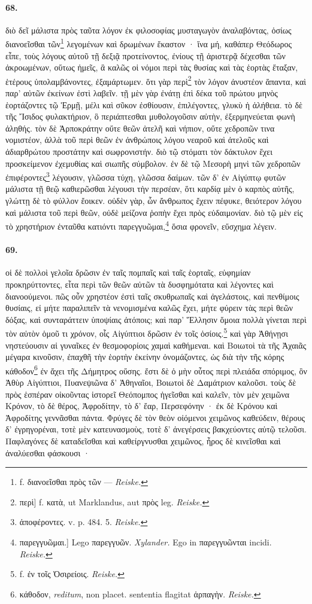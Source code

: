 \documentclass[a4paper, 11pt, oneside, polutonikogreek, german]{article}
\begin{document}
\paragraph{68.}
διὸ δεῖ μάλιστα πρὸς ταῦτα λόγον ἐκ φιλοσοφίας μυσταγωγὸν ἀναλαβόντας, ὁσίως διανοεῖσθαι τῶν\footnote{f. διανοεῖσθαι πρὸς τῶν --- \emph{Reiske.}} λεγομένων καὶ δρωμένων ἕκαστον · ἵνα μή, καθάπερ Θεόδωρος εἶπε, τοὺς λόγους αὐτοῦ τῇ δεξιᾷ προτείνοντος, ἐνίους τῇ ἀριστερᾷ δέχεσθαι τῶν ἀκροωμένων, οὕτως ἡμεῖς, ἃ καλῶς οἱ νόμοι περὶ τὰς θυσίας καὶ τὰς ἑορτὰς ἔταξαν, ἑτέρους ὑπολαμβάνοντες, ἐξαμάρτωμεν. ὅτι γὰρ περὶ\footnote{περὶ] f. κατὰ, ut Marklandus, aut πρὸς leg. \emph{Reiske.}} τὸν λόγον ἀνυστέον ἅπαντα, καὶ παρ' αὐτῶν ἐκείνων ἐστὶ λαβεῖν. τῇ μὲν γὰρ ἐνάτῃ ἐπὶ δέκα τοῦ πρώτου μηνὸς ἑορτάζοντες τῷ Ἑρμῇ, μέλι καὶ σῦκον ἐσθίουσιν, ἐπιλέγοντες, γλυκὺ ἡ ἀλήθεια. τὸ δὲ τῆς Ἴσιδος φυλακτήριον, ὃ περιάπτεσθαι μυθολογοῦσιν αὐτὴν, ἐξερμηνεύεται φωνὴ ἀληθής. τὸν δὲ Ἁρποκράτην οὔτε θεῶν ἀτελῆ καὶ νήπιον, οὔτε χεδροπῶν τινα νομιστέον, ἀλλὰ τοῦ περὶ θεῶν ἐν ἀνθρώποις λόγου νεαροῦ καὶ ἀτελοῦς καὶ ἀδιαρθρώτου προστάτην καὶ σωφρονιστήν. διὸ τῷ στόματι τὸν δάκτυλον ἔχει προσκείμενον ἐχεμυθίας καὶ σιωπῆς σύμβολον. ἐν δὲ τῷ Μεσορὴ μηνὶ τῶν χεδροπῶν ἐπιφέροντες\footnote{ἀποφέροντες. v. p. 484. 5. \emph{Reiske.}} λέγουσιν, γλῶσσα τύχη, γλῶσσα δαίμων. τῶν δ' ἐν Αἰγύπτῳ φυτῶν μάλιστα τῇ θεῷ καθιερῶσθαι λέγουσι τὴν περσέαν, ὅτι καρδίᾳ μὲν ὁ καρπὸς αὐτῆς, γλώττῃ δὲ τὸ φύλλον ἔοικεν. οὐδὲν γὰρ, ὧν ἄνθρωπος ἔχειν πέφυκε, θειότερον λόγου καὶ μάλιστα τοῦ περὶ θεῶν, οὐδὲ μείζονα ῥοπὴν ἔχει πρὸς εὐδαιμονίαν. διὸ τῷ μὲν εἰς τὸ χρηστήριον ἐνταῦθα κατιόντι παρεγγυῶμαι,\footnote{παρεγγυῶμαι.] Lego παρεγγυῶν. \emph{Xylander.} Ego in παρεγγυῶνται incidi. \emph{Reiske.}} ὅσια φρονεῖν, εὔσχημα λέγειν.

\paragraph{69.}
οἱ δὲ πολλοὶ γελοῖα δρῶσιν ἐν ταῖς πομπαῖς καὶ ταῖς ἑορταῖς, εὐφημίαν προκηρύττοντες, εἶτα περὶ τῶν θεῶν αὐτῶν τὰ δυσφημότατα καὶ λέγοντες καὶ διανοούμενοι. πῶς οὖν χρηστέον ἐστὶ ταῖς σκυθρωπαῖς καὶ ἀγελάστοις, καὶ πενθίμοις θυσίαις, εἰ μήτε παραλιπεῖν τὰ νενομισμένα καλῶς ἔχει, μήτε φύρειν τὰς περὶ θεῶν δόξας, καὶ συνταράττειν ὑποψίαις ἀτόποις; καὶ παρ' Ἕλλησιν ὅμοια πολλὰ γίνεται περὶ τὸν αὐτὸν ὁμοῦ τι χρόνον, οἷς Αἰγύπτιοι δρῶσιν ἐν τοῖς ὁσίοις.\footnote{f. ἐν τοῖς Ὀσιρείοις. \emph{Reiske.}} καὶ γὰρ Ἀθήνῃσι νηστεύουσιν αἱ γυναῖκες ἐν θεσμοφορίοις χαμαὶ καθήμεναι. καὶ Βοιωτοὶ τὰ τῆς Ἀχαιᾶς μέγαρα κινοῦσιν, ἐπαχθῆ τὴν ἑορτὴν ἐκείνην ὀνομάζοντες, ὡς διὰ τὴν τῆς κόρης κάθοδον\footnote{κάθοδον, \emph{reditum}, non placet. sententia flagitat ἁρπαγὴν. \emph{Reiske.} } ἐν ἄχει τῆς Δήμητρος οὔσης. ἔστι δὲ ὁ μὴν οὗτος περὶ πλειάδα σπόριμος, ὃν Ἀθὺρ Αἰγύπτιοι, Πυανεψιῶνα δ' Ἀθηναῖοι, Βοιωτοὶ δὲ Δαμάτριον καλοῦσι. τοὺς δὲ πρὸς ἑσπέραν οἰκοῦντας ἱστορεῖ Θεόπομπος ἡγεῖσθαι καὶ καλεῖν, τὸν μὲν χειμῶνα Κρόνον, τὸ δὲ θέρος, Ἀφροδίτην, τὸ δ' ἔαρ, Περσεφόνην · ἐκ δὲ Κρόνου καὶ Ἀφροδίτης γεννᾶσθαι πάντα. Φρύγες δὲ τὸν θεὸν οἰόμενοι χειμῶνος καθεύδειν, θέρους δ' ἐγρηγορέναι, τοτὲ μὲν κατευνασμοὺς, τοτὲ δ' ἀνεγέρσεις βακχεύοντες αὐτῷ τελοῦσι. Παφλαγόνες δὲ καταδεῖσθαι καὶ καθείργνυσθαι χειμῶνος, ἦρος δὲ κινεῖσθαι καὶ ἀναλύεσθαι φάσκουσι ·
\end{document}
